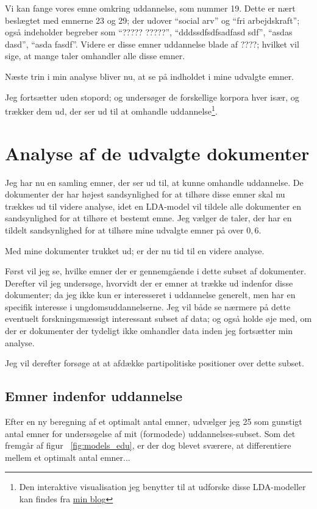 Vi kan fange vores emne omkring uddannelse, som nummer 19.
Dette er nært beslægtet med emnerne 23 og 29; der udover “social arv” og “fri arbejdskraft”; også indeholder begreber som “????? ?????”, “dddssdfsdfsadfasd sdf”, “asdas dasd”, “asda fasdf”.
Videre er disse emner uddannelse blade af ????; hvilket vil sige, at mange taler omhandler alle disse emner.

Næste trin i min analyse bliver nu, at se på indholdet i mine udvalgte emner.

Jeg fortsætter uden stopord; og undersøger de forskellige korpora hver især, og trækker dem ud, der ser ud til at omhandle uddannelse\footnote{Den interaktive visualisation jeg benytter til at udforske disse LDA-modeller kan findes fra \href{martinandreasandersen.com/projects/au/}{min blog}}.

\chapter{Analyse af de udvalgte dokumenter}
Jeg har nu en samling emner, der ser ud til, at kunne omhandle uddannelse.
De dokumenter der har højest sandsynlighed for at tilhøre disse emner skal nu trækkes ud til videre analyse, idet en LDA-model vil tildele alle dokumenter en sandsynlighed for at tilhøre et bestemt emne.
Jeg vælger de taler, der har en tildelt sandsynlighed for at tilhøre mine udvalgte emner på over $0,6$.

Med mine dokumenter trukket ud; er der nu tid til en videre analyse.

Først vil jeg se, hvilke emner der er gennemgående i dette subset af dokumenter.
Derefter vil jeg undersøge, hvorvidt der er emner at trække ud indenfor disse dokumenter; da jeg ikke kun er interesseret i uddannelse generelt, men har en specifik interesse i ungdomsuddannelserne.
Jeg vil både se nærmere på dette eventuelt forskningsmæssigt interessant subset af data; og også holde øje med, om der er dokumenter der tydeligt ikke omhandler data inden jeg fortsætter min analyse.

Jeg vil derefter forsøge at at afdække partipolitiske positioner over dette subset.

\section{Emner indenfor uddannelse}
Efter en ny beregning af et optimalt antal emner, udvælger jeg 25 som gunstigt antal emner for undersøgelse af mit (formodede) uddannelses-subset.
Som det fremgår af figur ~\ref{fig:models_edu}, er der dog blevet sværere, at differentiere mellem et optimalt antal emner...

